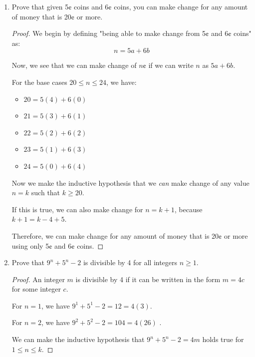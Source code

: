 \documentclass{article}
\begin{document}
\begin{enumerate}
    \item {
        Prove that given 5¢ coins and 6¢ coins, you can make change for any 
        amount of money that is 20¢ or more.

        \begin{proof}
            We begin by defining "being able to make change from 5¢ and 6¢ coins"
            as:
            \[n = 5a + 6b\]
            
            Now, we see that we can make change of \(n\)¢ if we can write \(n\)
            as \(5a + 6b\). 

            For the base cases \(20 \le n \le 24\), we have:
            \begin{itemize}
                \item \(20 = 5(4) + 6(0)\)
                \item \(21 = 5(3) + 6(1)\) 
                \item \(22 = 5(2) + 6(2)\) 
                \item \(23 = 5(1) + 6(3)\) 
                \item \(24 = 5(0) + 6(4)\)  
            \end{itemize}

            Now we make the inductive hypothesis that we \textit{can} make 
            change of any value \(n = k\) such that \(k \ge 20\).

            If this is true, we can also make change for \(n = k + 1\), because 
            \(k + 1 = k - 4 + 5\).

            Therefore, we can make change for any amount of money that is 20¢ or 
            more using only 5¢ and 6¢ coins.
        \end{proof}
    }

    \item {
        Prove that \(9^n + 5^n - 2\) is divisible by 4 for all integers \(n \ge 1\). 

        \begin{proof}
            An integer \(m\) is divisible by 4 if it can be written in the form 
            \(m = 4c\) for some integer \(c\).

            For \(n=1\), we have \(9^1 + 5^1 - 2 = 12 = 4(3)\).

            For \(n=2\), we have \(9^2 + 5^2 - 2 = 104 = 4(26)\) .

            We can make the inductive hypothesis that \(9^n + 5^n - 2 = 4m\)
            holds true for \(1 \le n \le k\).


\end{proof}}
\end{enumerate}
\end{document}
